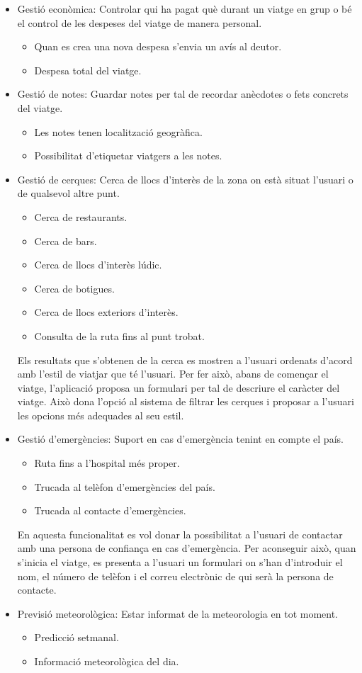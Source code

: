 \begin{itemize}
\item{Gestió econòmica:} Controlar qui ha pagat què durant un viatge en grup o bé
el control de les despeses del viatge de manera personal.
\begin{itemize}
\item{}Quan es crea una nova despesa s'envia un avís al deutor.
\item{}Despesa total del viatge.
\end{itemize}
\item{}Gestió de notes: Guardar notes per tal de recordar anècdotes o fets concrets
del viatge.
\begin{itemize}
\item{}Les notes tenen localització geogràfica.
\item{}Possibilitat d'etiquetar viatgers a les notes.
\end{itemize}
\item{}Gestió de cerques: Cerca de llocs d'interès de la zona on està situat l'usuari o de qualsevol altre punt.
\begin{itemize}
\item{}Cerca de restaurants.
\item{}Cerca de bars.
\item{}Cerca de llocs d'interès lúdic.
\item{}Cerca de botigues.
\item{}Cerca de llocs exteriors d'interès.
\item{}Consulta de la ruta fins al punt trobat.
\end{itemize}
Els resultats que s'obtenen de la cerca es mostren a l'usuari ordenats d'acord amb l'estil de viatjar que té l'usuari. Per fer això, abans de començar el viatge, l'aplicació proposa un formulari per tal de descriure el caràcter del viatge. Això dona l'opció al sistema de filtrar les cerques i proposar a l'usuari les opcions més adequades al seu estil.

\item{}Gestió d'emergències: Suport en cas d'emergència tenint en compte el país.
\begin{itemize}
\item{}Ruta fins a l'hospital més proper.
\item{}Trucada al telèfon d'emergències del país.
\item{}Trucada al contacte d'emergències.
\end{itemize}
En aquesta funcionalitat es vol donar la possibilitat a l'usuari de contactar amb una persona de confiança en cas d'emergència. Per aconseguir això, quan s'inicia el viatge, es presenta a l'usuari un formulari on s'han d'introduir el nom, el número de telèfon i el correu electrònic de qui serà la persona de contacte.

\item{}Previsió meteorològica: Estar informat de la meteorologia en tot moment.
\begin{itemize}
\item{}Predicció setmanal.
\item{}Informació meteorològica del dia.
\end{itemize}
\end{itemize}

